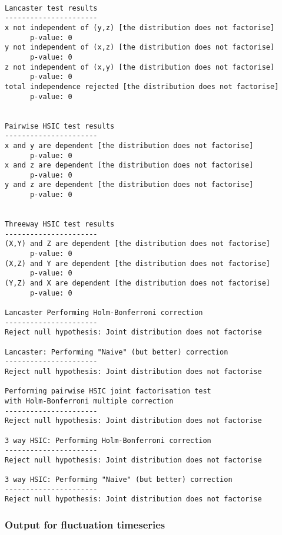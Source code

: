 \documentclass[12pt]{article}
\numberwithin{claim}{section}
\numberwithin{lemma}{section}
\numberwithin{theorem}{section}
\begin{document}
\begin{verbatim}

Lancaster test results
----------------------
x not independent of (y,z) [the distribution does not factorise]
      p-value: 0
y not independent of (x,z) [the distribution does not factorise]
      p-value: 0
z not independent of (x,y) [the distribution does not factorise]
      p-value: 0
total independence rejected [the distribution does not factorise]
      p-value: 0


Pairwise HSIC test results
----------------------
x and y are dependent [the distribution does not factorise]
      p-value: 0
x and z are dependent [the distribution does not factorise]
      p-value: 0
y and z are dependent [the distribution does not factorise]
      p-value: 0


Threeway HSIC test results
----------------------
(X,Y) and Z are dependent [the distribution does not factorise]
      p-value: 0
(X,Z) and Y are dependent [the distribution does not factorise]
      p-value: 0
(Y,Z) and X are dependent [the distribution does not factorise]
      p-value: 0

Lancaster Performing Holm-Bonferroni correction
----------------------
Reject null hypothesis: Joint distribution does not factorise

Lancaster: Performing "Naive" (but better) correction
----------------------
Reject null hypothesis: Joint distribution does not factorise

Performing pairwise HSIC joint factorisation test 
with Holm-Bonferroni multiple correction
----------------------
Reject null hypothesis: Joint distribution does not factorise

3 way HSIC: Performing Holm-Bonferroni correction
----------------------
Reject null hypothesis: Joint distribution does not factorise

3 way HSIC: Performing "Naive" (but better) correction
----------------------
Reject null hypothesis: Joint distribution does not factorise

\end{verbatim}


\subsubsection{Output for fluctuation timeseries}
\end{document}
